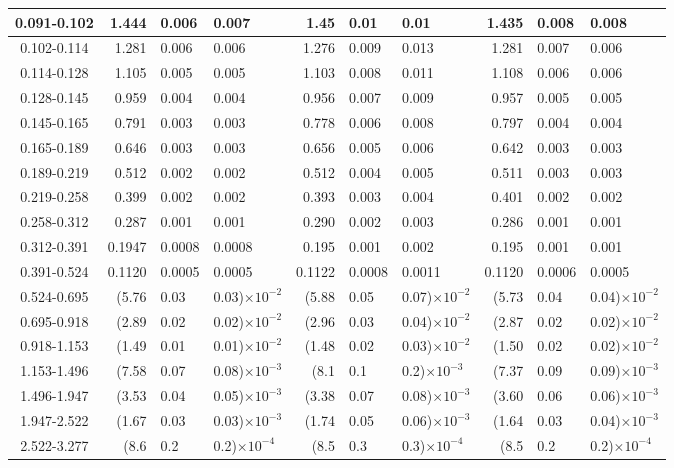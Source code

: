 \begin{table}[!htbp]
{\begin{tabular}{ | c | r@{$\pm$}l@{$\pm$}l | r@{$\pm$}l@{$\pm$}l |  r@{$\pm$}l@{$\pm$}l | }
0.091-0.102 & 1.444&0.006&0.007 & 1.45&0.01&0.01 & 1.435&0.008&0.008 \\ \hline
0.102-0.114 & 1.281&0.006&0.006 & 1.276&0.009&0.013 & 1.281&0.007&0.006 \\ \hline
0.114-0.128 & 1.105&0.005&0.005 & 1.103&0.008&0.011 & 1.108&0.006&0.006 \\ \hline
0.128-0.145 & 0.959&0.004&0.004 & 0.956&0.007&0.009 & 0.957&0.005&0.005 \\ \hline
0.145-0.165 & 0.791&0.003&0.003 & 0.778&0.006&0.008 & 0.797&0.004&0.004 \\ \hline
0.165-0.189 & 0.646&0.003&0.003 & 0.656&0.005&0.006 & 0.642&0.003&0.003 \\ \hline
0.189-0.219 & 0.512&0.002&0.002 & 0.512&0.004&0.005 & 0.511&0.003&0.003 \\ \hline
0.219-0.258 & 0.399&0.002&0.002 & 0.393&0.003&0.004 & 0.401&0.002&0.002 \\ \hline
0.258-0.312 & 0.287&0.001&0.001 & 0.290&0.002&0.003 & 0.286&0.001&0.001 \\ \hline
0.312-0.391 & 0.1947&0.0008&0.0008 & 0.195&0.001&0.002 & 0.195&0.001&0.001 \\ \hline
0.391-0.524 & 0.1120&0.0005&0.0005 & 0.1122&0.0008&0.0011 & 0.1120&0.0006&0.0005 \\ \hline
0.524-0.695 & (5.76&0.03&0.03)$\times 10^{-2}$ & (5.88&0.05&0.07)$\times 10^{-2}$ & (5.73&0.04&0.04)$\times 10^{-2}$ \\ \hline
0.695-0.918 & (2.89&0.02&0.02)$\times 10^{-2}$ & (2.96&0.03&0.04)$\times 10^{-2}$ & (2.87&0.02&0.02)$\times 10^{-2}$ \\ \hline
0.918-1.153 & (1.49&0.01&0.01)$\times 10^{-2}$ & (1.48&0.02&0.03)$\times 10^{-2}$ & (1.50&0.02&0.02)$\times 10^{-2}$ \\ \hline
1.153-1.496 & (7.58&0.07&0.08)$\times 10^{-3}$ & (8.1&0.1&0.2)$\times 10^{-3}$ & (7.37&0.09&0.09)$\times 10^{-3}$ \\ \hline
1.496-1.947 & (3.53&0.04&0.05)$\times 10^{-3}$ & (3.38&0.07&0.08)$\times 10^{-3}$ & (3.60&0.06&0.06)$\times 10^{-3}$ \\ \hline
1.947-2.522 & (1.67&0.03&0.03)$\times 10^{-3}$ & (1.74&0.05&0.06)$\times 10^{-3}$ & (1.64&0.03&0.04)$\times 10^{-3}$ \\ \hline
2.522-3.277 & (8.6&0.2&0.2)$\times 10^{-4}$ & (8.5&0.3&0.3)$\times 10^{-4}$ & (8.5&0.2&0.2)$\times 10^{-4}$ \\ \hline
\end{tabular}}
\end{table}
